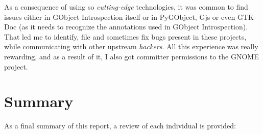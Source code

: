 As a consequence of using so {\it cutting-edge} technologies, it was common to find
issues either in GObject Introspection itself or in PyGObject, Gjs or even GTK-Doc
(as it needs to recognize the annotations used in GObject Introspection). That led me to
identify, file and sometimes fix bugs present in these projects, while communicating
with other upstream {\it hackers}. All this experience was really rewarding, and
as a result of it, I also got committer permissions to the GNOME project.

\section{Summary}

As a final summary of this report, a review of each individual is provided:

